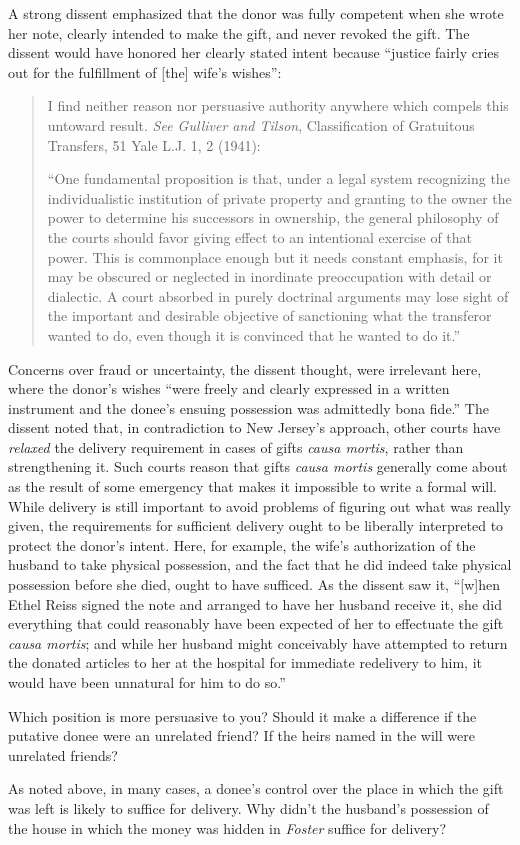 A strong dissent emphasized that the donor was fully competent when she wrote
her note, clearly intended to make the gift, and never revoked the gift.  The
dissent would have honored her clearly stated intent because ``justice fairly
cries out for the fulfillment of [the] wife's wishes'':
\begin{quotation}
I find neither reason nor persuasive authority anywhere which compels this
untoward result. \emph{See Gulliver and Tilson}, Classification of Gratuitous
Transfers, 51 Yale L.J. 1, 2 (1941):

``One fundamental proposition is that, under a legal system recognizing the
individualistic institution of private property and granting to the owner the
power to determine his successors in ownership, the general philosophy of the
courts should favor giving effect to an intentional exercise of that power.
This is commonplace enough but it needs constant emphasis, for it may be
obscured or neglected in inordinate preoccupation with detail or dialectic. A
court absorbed in purely doctrinal arguments may lose sight of the important
and desirable objective of sanctioning what the transferor wanted to do, even
though it is convinced that he wanted to do it.''
\end{quotation}
Concerns over fraud or uncertainty, the dissent thought, were irrelevant here,
where the donor's wishes ``were freely and clearly expressed in a written
instrument and the donee's ensuing possession was admittedly bona fide.''  The
dissent noted that, in contradiction to New Jersey's approach, other courts
have \textit{relaxed} the delivery requirement in cases of gifts \textit{causa
mortis}, rather than strengthening it.  Such courts reason that gifts
\textit{causa mortis} generally come about as the result of some emergency that
makes it impossible to write a formal will.  While delivery is still important
to avoid problems of figuring out what was really given, the requirements for
sufficient delivery ought to be liberally interpreted to protect the donor's
intent.  Here, for example, the wife's authorization of the husband to take
physical possession, and the fact that he did indeed take physical possession
before she died, ought to have sufficed.  As the dissent saw it, ``[w]hen Ethel
Reiss signed the note and arranged to have her husband receive it, she did
everything that could reasonably have been expected of her to effectuate the
gift \textit{causa mortis}; and while her husband might conceivably have
attempted to return the donated articles to her at the hospital for immediate
redelivery to him, it would have been unnatural for him to do so.''

Which position is more persuasive to you?  Should it make a difference if the
putative donee were an unrelated friend?  If the heirs named in the will were
unrelated friends?

As noted above, in many cases, a donee's control over the place in which the
gift was left is likely to suffice for delivery.  Why didn't the husband's
possession of the house in which the money was hidden in \textit{Foster}
suffice for delivery?

